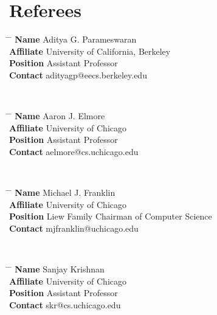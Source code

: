 \documentclass[10pt]{article} %
\begin{document}
\section{Referees}

\parbox{0.5\textwidth}{ %
\begin{tabbing}
\hspace{1.5cm} \= \hspace{4cm} \= \kill %
{\bf Name} \> Aditya G. Parameswaran \\ %
{\bf Affiliate} \> University of California, Berkeley \\ %
{\bf Position} \> Assistant Professor \\ %
{\bf Contact} \> adityagp@eecs.berkeley.edu %
\end{tabbing}}
\\
\parbox{0.5\textwidth}{ %
\begin{tabbing}
\hspace{1.5cm} \= \hspace{4cm} \= \kill %
{\bf Name} \> Aaron J. Elmore \\ %
{\bf Affiliate} \> University of Chicago \\ %
{\bf Position} \> Assistant Professor \\ %
{\bf Contact} \> aelmore@cs.uchicago.edu %
\end{tabbing}}
\\
\parbox{0.5\textwidth}{ %
\begin{tabbing}
\hspace{1.5cm} \= \hspace{4cm} \= \kill %
{\bf Name} \> Michael J. Franklin \\ %
{\bf Affiliate} \> University of Chicago \\ %
{\bf Position} \> Liew Family Chairman of Computer Science \\ %
{\bf Contact} \> mjfranklin@uchicago.edu %
\end{tabbing}}
\\
\parbox{0.5\textwidth}{ %
\begin{tabbing}
\hspace{1.5cm} \= \hspace{4cm} \= \kill %
{\bf Name} \> Sanjay Krishnan \\ %
{\bf Affiliate} \> University of Chicago \\ %
{\bf Position} \> Assistant Professor \\ %
{\bf Contact} \> skr@cs.uchicago.edu %
\end{tabbing}}
\end{document}
